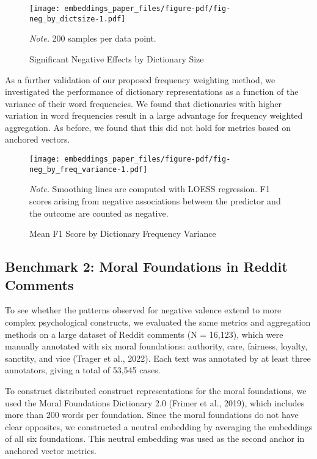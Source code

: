 \documentclass[
  man,
  floatsintext,
  longtable,
  nolmodern,
  notxfonts,
  notimes,
  colorlinks=true,linkcolor=blue,citecolor=blue,urlcolor=blue]{apa7}
\begin{document}
\begin{figure}

{\caption{{Significant Negative Effects by Dictionary
Size}{\label{fig-neg\_by\_dictsize}}}}

\texttt{[image: embeddings\_paper\_files/figure-pdf/fig-neg\_by\_dictsize-1.pdf]}

{\noindent \emph{Note.} 200 samples per data point.}

\end{figure}

As a further validation of our proposed frequency weighting method, we
investigated the performance of dictionary representations as a function
of the variance of their word frequencies. We found that dictionaries
with higher variation in word frequencies result in a large advantage
for frequency weighted aggregation. As before, we found that this did
not hold for metrics based on anchored vectors.

\begin{figure}

{\caption{{Mean F1 Score by Dictionary Frequency
Variance}{\label{fig-neg\_by\_freq\_variance}}}}

\texttt{[image: embeddings\_paper\_files/figure-pdf/fig-neg\_by\_freq\_variance-1.pdf]}

{\noindent \emph{Note.} Smoothing lines are computed with LOESS
regression. F1 scores arising from negative associations between the
predictor and the outcome are counted as negative.}

\end{figure}

\subsection{Benchmark 2: Moral Foundations in Reddit
Comments}\label{benchmark-2-moral-foundations-in-reddit-comments}

To see whether the patterns observed for negative valence extend to more
complex psychological constructs, we evaluated the same metrics and
aggregation methods on a large dataset of Reddit comments (N = 16,123),
which were manually annotated with six moral foundations: authority,
care, fairness, loyalty, sanctity, and vice (Trager et al., 2022). Each
text was annotated by at least three annotators, giving a total of
53,545 cases.

To construct distributed construct representations for the moral
foundations, we used the Moral Foundations Dictionary 2.0 (Frimer et
al., 2019), which includes more than 200 words per foundation. Since the
moral foundations do not have clear opposites, we constructed a neutral
embedding by averaging the embeddings of all six foundations. This
neutral embedding was used as the second anchor in anchored vector
metrics.
\end{document}
